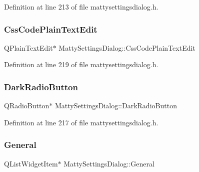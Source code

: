 Definition at line 213 of file mattysettingsdialog.\+h.

\hypertarget{classMattySettingsDialog_a9e655435f2bcca518d5a9b8ae6244257}{}\label{classMattySettingsDialog_a9e655435f2bcca518d5a9b8ae6244257} 
\subsubsection{\texorpdfstring{Css\+Code\+Plain\+Text\+Edit}{CssCodePlainTextEdit}}
{\footnotesize\ttfamily Q\+Plain\+Text\+Edit$\ast$ Matty\+Settings\+Dialog\+::\+Css\+Code\+Plain\+Text\+Edit\hspace{0.3cm}{\ttfamily [private]}}



Definition at line 219 of file mattysettingsdialog.\+h.

\hypertarget{classMattySettingsDialog_a118d63e6468ca5d5b2bbb68241e3bae5}{}\label{classMattySettingsDialog_a118d63e6468ca5d5b2bbb68241e3bae5} 
\subsubsection{\texorpdfstring{Dark\+Radio\+Button}{DarkRadioButton}}
{\footnotesize\ttfamily Q\+Radio\+Button$\ast$ Matty\+Settings\+Dialog\+::\+Dark\+Radio\+Button\hspace{0.3cm}{\ttfamily [private]}}



Definition at line 217 of file mattysettingsdialog.\+h.

\hypertarget{classMattySettingsDialog_a5f12126027ce73f0e7e554322d8a46c9}{}\label{classMattySettingsDialog_a5f12126027ce73f0e7e554322d8a46c9} 
\subsubsection{\texorpdfstring{General}{General}}
{\footnotesize\ttfamily Q\+List\+Widget\+Item$\ast$ Matty\+Settings\+Dialog\+::\+General\hspace{0.3cm}{\ttfamily [private]}}



